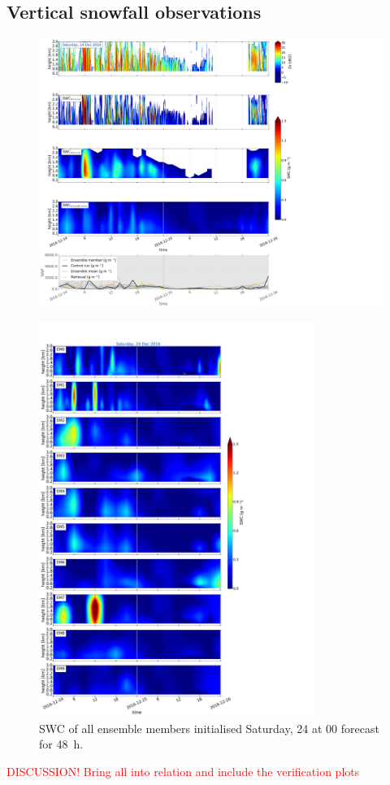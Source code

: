 \subsection{Vertical snowfall observations}\label{sec:vertEM09:2412}
\begin{figure}[t]
	\centering
	\includegraphics[trim={0.4cm .4cm 31.3cm 63.5cm},clip,width=\textwidth]{./fig_SWC/20161224}
	\caption{}\label{fig:SWP24}
\end{figure}
%
\begin{figure}[t]
	\centering
	\includegraphics[trim={0cm 0cm 18.3cm 5.1cm},clip,width=0.8\textwidth]{./fig_09EM/20161224}
	\caption{SWC of all ensemble members initialised Saturday, \SI{24}{\dec} at 0\SI{0}{\UTC} forecast for \SI{48}{\hour}.}\label{fig:EM09_24}
\end{figure}
\textcolor{red}{DISCUSSION! Bring all into relation and include the verification plots}
